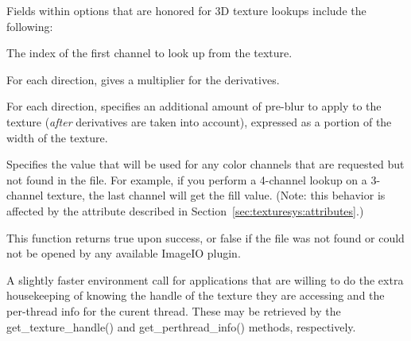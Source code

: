 Fields within {\cf options} that are honored for 3D texture lookups
include the following:

\vspace{-12pt}
\vspace{10pt}
The index of the first channel to look up from the texture.
\apiend

\vspace{-24pt}
\vspace{10pt}
For each direction, gives a multiplier for the derivatives.
\apiend

\vspace{-24pt}
\vspace{10pt}
For each direction, specifies an additional amount of pre-blur to apply
to the texture (\emph{after} derivatives are taken into account),
expressed as a portion of the width of the texture.
\apiend

\vspace{-24pt}
\vspace{10pt}
Specifies the value that will be used for any color channels that are
requested but not found in the file.  For example, if you perform a
4-channel lookup on a 3-channel texture, the last channel will
get the fill value.  (Note: this behavior is affected by the
 attribute described in 
Section~\ref{sec:texturesys:attributes}.)
\apiend

This function returns {\cf true} upon success, or {\cf false} if the
file was not found or could not be opened by any available ImageIO
plugin.
\apiend

A slightly faster {\cf environment} call for applications that are willing
to do the extra housekeeping of knowing the handle of the texture they
are accessing and the per-thread info for the curent thread.  These
may be retrieved by the {\cf get_texture_handle()} and 
{\cf get_perthread_info()} methods, respectively.
\apiend

